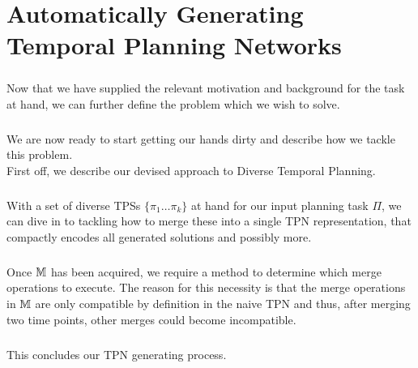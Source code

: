 \chapter[Automatically Generating TPNs]{Automatically Generating Temporal Planning Networks}
\label{chap: generating TPNS}

\paragraph{}Now that we have supplied the relevant motivation and background for the task at hand, we can further define the problem which we wish to solve. 



\paragraph{}We are now ready to start getting our hands dirty and describe how we tackle this problem. \\
First off, we describe our devised approach to Diverse Temporal Planning.



\paragraph{}With a set of diverse TPSs $\{\pi_1 \ldots \pi_k\}$ at hand for our input planning task $\Pi$, we can dive in to tackling how to merge these into a single TPN representation, that compactly encodes all generated solutions and possibly more.



\paragraph{} Once $\mathbb{M}$ has been acquired, we require a method to determine which merge operations to execute. The reason for this necessity is that the merge operations in $\mathbb{M}$ are only compatible by definition in the naive TPN and thus, after merging two time points, other merges could become incompatible.



\paragraph{} This concludes our TPN generating process.
